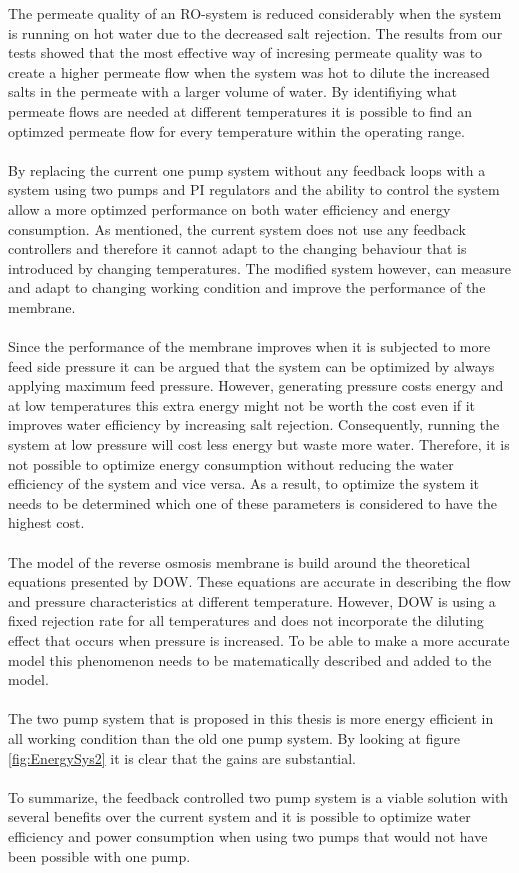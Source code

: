 The permeate quality of an RO-system is reduced considerably when the system is running on hot water due to the decreased salt rejection. The results from our tests showed that the most effective way of incresing permeate quality was to create a higher permeate flow when the system was hot to dilute the increased salts in the permeate with a larger volume of water. By identifiying what permeate flows are needed at different temperatures it is possible to find an optimzed permeate flow for every temperature within the operating range.\\
 \\
By replacing the current one pump system without any feedback loops with a system using two pumps and PI regulators and the ability to control the system allow a more optimzed performance on both water efficiency and energy consumption. As mentioned, the current system does not use any feedback controllers and therefore it cannot adapt to the changing behaviour that is introduced by changing temperatures. The modified system however, can measure and adapt to changing working condition and improve the performance of the membrane. \\
 \\
Since the performance of the membrane improves when it is subjected to more feed side pressure it can be argued that the system can be optimized by always applying maximum feed pressure. However, generating pressure costs energy and at low temperatures this extra energy might not be worth the cost even if it improves water efficiency by increasing salt rejection. Consequently, running the system at low pressure will cost less energy but waste more water. Therefore, it is not possible to optimize energy consumption without reducing the water efficiency of the system and vice versa. As a result, to optimize the system it needs to be determined which one of these parameters is considered to have the highest cost. \\
 \\
The model of the reverse osmosis membrane is build around the theoretical equations presented by DOW. These equations are accurate in describing the flow and pressure characteristics at different temperature. However, DOW is using a fixed rejection rate for all temperatures and does not incorporate the diluting effect that occurs when pressure is increased.  To be able to make a more accurate model this phenomenon needs to be matematically described and added to the model. \\
 \\
 The two pump system that is proposed in this thesis is more energy efficient in all working condition than the old one pump system. By looking at figure \ref{fig:EnergySys2} it is clear that the gains are substantial. \\
  \\
To summarize, the feedback controlled two pump system is a viable solution with several benefits over the current system and it is possible to optimize water efficiency and power consumption when using two pumps that would not have been possible with one pump. 